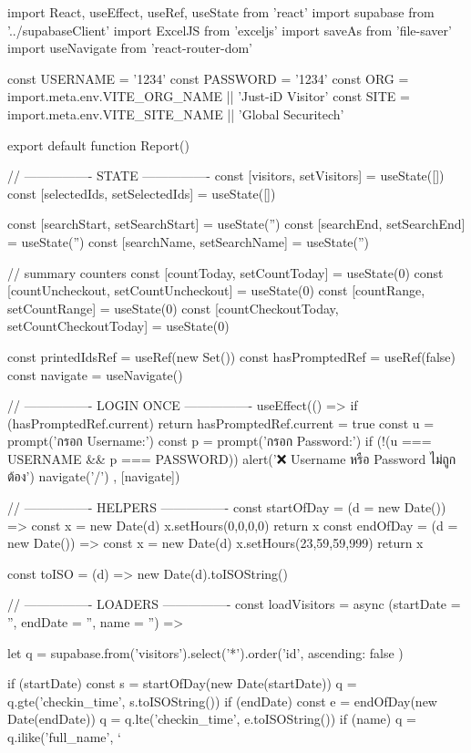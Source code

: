 import React, { useEffect, useRef, useState } from 'react'
import { supabase } from '../supabaseClient'
import ExcelJS from 'exceljs'
import { saveAs } from 'file-saver'
import { useNavigate } from 'react-router-dom'

const USERNAME = '1234'
const PASSWORD = '1234'
const ORG = import.meta.env.VITE_ORG_NAME || 'Just-iD Visitor'
const SITE = import.meta.env.VITE_SITE_NAME || 'Global Securitech'

export default function Report() {
  // ---------------- STATE ----------------
  const [visitors, setVisitors] = useState([])
  const [selectedIds, setSelectedIds] = useState([])

  const [searchStart, setSearchStart] = useState('')
  const [searchEnd, setSearchEnd] = useState('')
  const [searchName, setSearchName] = useState('')

  // summary counters
  const [countToday, setCountToday] = useState(0)
  const [countUncheckout, setCountUncheckout] = useState(0)
  const [countRange, setCountRange] = useState(0)
  const [countCheckoutToday, setCountCheckoutToday] = useState(0)

  const printedIdsRef = useRef(new Set())
  const hasPromptedRef = useRef(false)
  const navigate = useNavigate()

  // ---------------- LOGIN ONCE ----------------
  useEffect(() => {
    if (hasPromptedRef.current) return
    hasPromptedRef.current = true
    const u = prompt('กรอก Username:')
    const p = prompt('กรอก Password:')
    if (!(u === USERNAME && p === PASSWORD)) {
      alert('❌ Username หรือ Password ไม่ถูกต้อง')
      navigate('/')
    }
  }, [navigate])

  // ---------------- HELPERS ----------------
  const startOfDay = (d = new Date()) => {
    const x = new Date(d)
    x.setHours(0,0,0,0)
    return x
  }
  const endOfDay = (d = new Date()) => {
    const x = new Date(d)
    x.setHours(23,59,59,999)
    return x
  }

  const toISO = (d) => new Date(d).toISOString()

  // ---------------- LOADERS ----------------
  const loadVisitors = async (startDate = '', endDate = '', name = '') => {
    let q = supabase.from('visitors').select('*').order('id', { ascending: false })

    if (startDate) {
      const s = startOfDay(new Date(startDate))
      q = q.gte('checkin_time', s.toISOString())
    }
    if (endDate) {
      const e = endOfDay(new Date(endDate))
      q = q.lte('checkin_time', e.toISOString())
    }
    if (name) q = q.ilike('full_name', `%

}}
